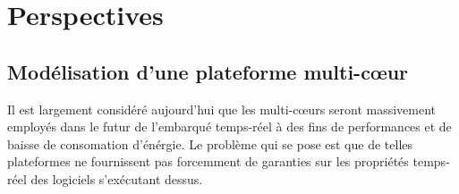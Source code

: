 

\section{Perspectives}
\label{sec:future}


  \subsection{Modélisation d'une plateforme multi-c{\oe}ur}



    Il est largement considéré aujourd'hui que les multi-c{\oe}urs
    seront massivement employés dans le futur de l'embarqué temps-réel à des
    fins de performances et de baisse de consomation d'énérgie. Le problème qui
    se pose est que de telles plateformes ne fournissent pas forcemment de
    garanties sur les propriétés temps-réel des logiciels s'exécutant dessus.

